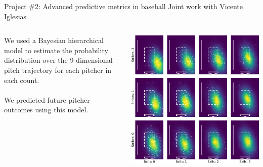 \documentclass[handout]{beamer}
\begin{document}
\begin{frame}{Project \#2: Advanced predictive metrics in baseball}
  {Joint work with Vicente Iglesias}
  \begin{columns}
    \begin{column}{0.35\textwidth}
      We used a Bayesian hierarchical model to estimate the probability distribution over the 9-dimensional pitch trajectory for each pitcher in each count.\\
      ~\\
      We predicted future pitcher outcomes using this model.
    \end{column}
    \begin{column}{0.65\textwidth}
      \includegraphics[height = \textwidth]{images/656302_SL_R_plate.png}
    \end{column}
  \end{columns}
\end{frame}
\end{document}
